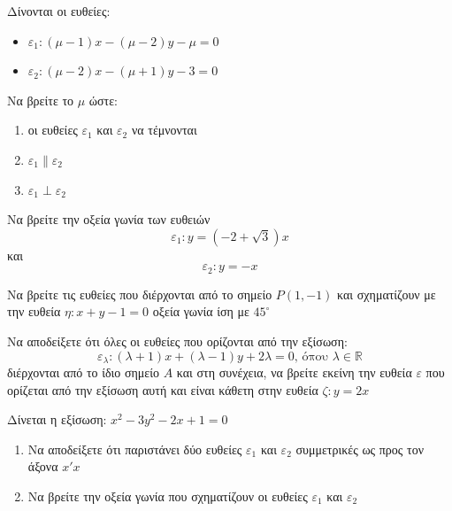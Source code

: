 \documentclass{../../presentation}
\begin{document}
\begin{askisi} Δίνονται οι ευθείες:
  \begin{itemize}
    \item $ε_1:(μ-1)x-(μ-2)y-μ=0$
    \item $ε_2:(μ-2)x-(μ+1)y-3=0$
  \end{itemize}
  Να βρείτε το $μ$ ώστε:
  \begin{enumerate}
    \item<1-> οι ευθείες $ε_1$ και $ε_2$ να τέμνονται
    \item<2-> $ε_1 \parallel ε_2$
    \item<3-> $ε_1 \perp ε_2$
  \end{enumerate}

\end{askisi}

\begin{askisi} Να βρείτε την οξεία γωνία των ευθειών
  $$ε_1:y=(-2+\sqrt{3})x$$
  και
  $$ε_2:y=-x$$
\end{askisi}

\begin{askisi} Να βρείτε τις ευθείες που διέρχονται από το σημείο $Ρ(1,-1)$ και σχηματίζουν με την ευθεία $η:x+y-1=0$ οξεία γωνία ίση με $45^{\circ}$

\end{askisi}

\begin{askisi} Να αποδείξετε ότι όλες οι ευθείες που ορίζονται από την εξίσωση:
  $$ε_λ:(λ+1)x+(λ-1)y+2λ=0 \text{, όπου } λ\in\mathbb{R}$$
  διέρχονται από το ίδιο σημείο $Α$ και στη συνέχεια, να βρείτε εκείνη την ευθεία $ε$ που ορίζεται από την εξίσωση αυτή και είναι κάθετη στην ευθεία $ζ:y=2x$
\end{askisi}

\begin{askisi} Δίνεται η εξίσωση: $x^2-3y^2-2x+1=0$
  \begin{enumerate}
    \item<1-> Να αποδείξετε ότι παριστάνει δύο ευθείες $ε_1$ και $ε_2$ συμμετρικές ως προς τον άξονα $x'x$
    \item<2-> Να βρείτε την οξεία γωνία που σχηματίζουν οι ευθείες $ε_1$ και $ε_2$
  \end{enumerate}

\end{askisi}

% 
\end{document}
